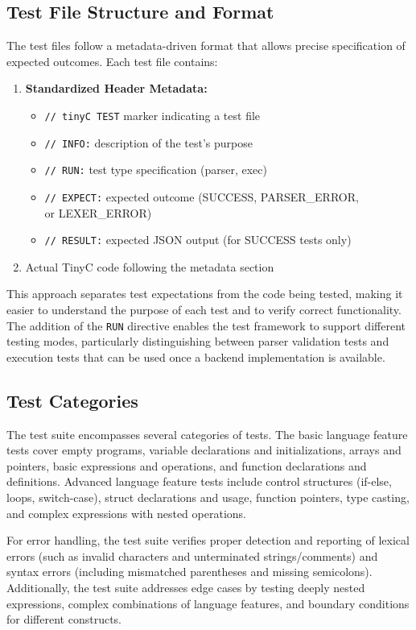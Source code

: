 \subsection{Test File Structure and Format}
The test files follow a metadata-driven format that allows precise specification of expected outcomes. Each test file contains:
\begin{enumerate}
\item \textbf{Standardized Header Metadata:}
\begin{itemize}
\item \texttt{// tinyC TEST} marker indicating a test file
\item \texttt{// INFO:} description of the test's purpose
\item \texttt{// RUN:} test type specification (parser, exec)
\item \texttt{// EXPECT:} expected outcome (SUCCESS, PARSER_ERROR, \\or LEXER_ERROR)
\item \texttt{// RESULT:} expected JSON output (for SUCCESS tests only)
\end{itemize}
\item Actual TinyC code following the metadata section
\end{enumerate}
This approach separates test expectations from the code being tested, making it easier to understand the purpose of each test and to verify correct functionality. The addition of the \texttt{RUN} directive enables the test framework to support different testing modes, particularly distinguishing between parser validation tests and execution tests that can be used once a backend implementation is available.

\subsection{Test Categories}


The test suite encompasses several categories of tests. The basic language feature tests cover empty programs, variable declarations and initializations, arrays and pointers, basic expressions and operations, and function declarations and definitions. Advanced language feature tests include control structures (if-else, loops, switch-case), struct declarations and usage, function pointers, type casting, and complex expressions with nested operations.

For error handling, the test suite verifies proper detection and reporting of lexical errors (such as invalid characters and unterminated strings/comments) and syntax errors (including mismatched parentheses and missing semicolons). Additionally, the test suite addresses edge cases by testing deeply nested expressions, complex combinations of language features, and boundary conditions for different constructs.

